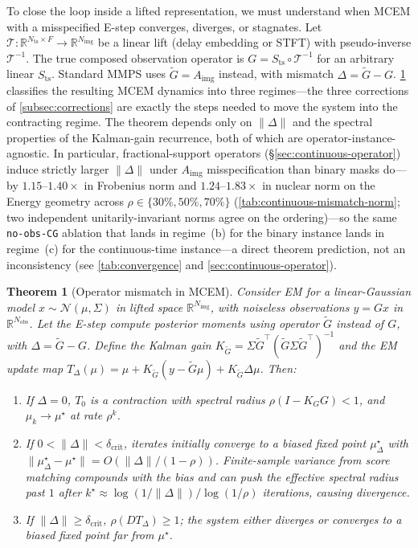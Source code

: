 \documentclass{article}
\theoremstyle{plain}
\newtheorem{theorem}{Theorem}[section]
\theoremstyle{definition}
\theoremstyle{remark}
\newcommand{\tsimg}{\mathcal{T}}
\newcommand{\imgts}{\mathcal{T}^{-1}}
\newcommand{\Nts}{N_{\mathrm{ts}}}
\newcommand{\Nimg}{N_{\mathrm{img}}}
\newcommand{\Nobs}{N_{\mathrm{obs}}}
\newcommand{\Aimg}{A_{\mathrm{img}}}
\begin{document}
To close the loop inside a lifted representation, we must understand when MCEM with a misspecified E-step converges, diverges, or stagnates. Let $\tsimg : \mathbb{R}^{\Nts \times F} \to \mathbb{R}^{\Nimg}$ be a linear lift (delay embedding or STFT) with pseudo-inverse $\imgts$. The true composed observation operator is $G = S_{\mathrm{ts}} \circ \imgts$ for an arbitrary linear $S_{\mathrm{ts}}$. Standard MMPS uses $\tilde{G} = \Aimg$ instead, with mismatch $\Delta = \tilde{G} - G$. \cref{thm:operator-mismatch} classifies the resulting MCEM dynamics into three regimes---the three corrections of \cref{subsec:corrections} are exactly the steps needed to move the system into the contracting regime. The theorem depends only on $\|\Delta\|$ and the spectral properties of the Kalman-gain recurrence, both of which are operator-instance-agnostic. In particular, fractional-support operators (\S\ref{sec:continuous-operator}) induce strictly larger $\|\Delta\|$ under $\Aimg$ misspecification than binary masks do---by $1.15$--$1.40\times$ in Frobenius norm and $1.24$--$1.83\times$ in nuclear norm on the Energy geometry across $\rho \in \{30\%,50\%,70\%\}$ (\cref{tab:continuous-mismatch-norm}; two independent unitarily-invariant norms agree on the ordering)---so the same \texttt{no-obs-CG} ablation that lands in regime~(b) for the binary instance lands in regime~(c) for the continuous-time instance---a direct theorem prediction, not an inconsistency (see \cref{tab:convergence} and \cref{sec:continuous-operator}).

\begin{theorem}[Operator mismatch in MCEM]
\label{thm:operator-mismatch}
Consider EM for a linear-Gaussian model $x \sim \mathcal{N}(\mu, \Sigma)$ in lifted space $\mathbb{R}^{\Nimg}$, with noiseless observations $y = Gx$ in $\mathbb{R}^{\Nobs}$. Let the E-step compute posterior moments using operator $\tilde{G}$ instead of $G$, with $\Delta = \tilde{G} - G$. Define the Kalman gain $K_{\tilde{G}} = \Sigma \tilde{G}^\top (\tilde{G} \Sigma \tilde{G}^\top)^{-1}$ and the EM update map $T_\Delta(\mu) = \mu + K_{\tilde{G}}(y - \tilde{G}\mu) + K_{\tilde{G}} \Delta \mu$. Then:
\begin{enumerate}
\setlength{\itemsep}{0pt}
\item[(a)] If $\Delta = 0$, $T_0$ is a contraction with spectral radius $\rho(I - K_G G) < 1$, and $\mu_k \to \mu^\star$ at rate $\rho^k$.
\item[(b)] If $0 < \|\Delta\| < \delta_{\mathrm{crit}}$, iterates initially converge to a biased fixed point $\mu^\star_\Delta$ with $\|\mu^\star_\Delta - \mu^\star\| = O(\|\Delta\|/(1-\rho))$. Finite-sample variance from score matching compounds with the bias and can push the effective spectral radius past $1$ after $k^\star \approx \log(1/\|\Delta\|)/\log(1/\rho)$ iterations, causing divergence.
\item[(c)] If $\|\Delta\| \geq \delta_{\mathrm{crit}}$, $\rho(DT_\Delta) \geq 1$; the system either diverges or converges to a biased fixed point far from $\mu^\star$.
\end{enumerate}
\end{theorem}
\end{document}
